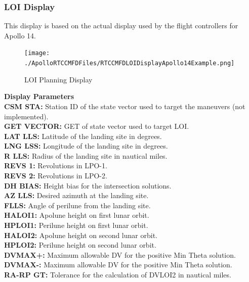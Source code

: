 \documentclass[11pt]{article} %
\begin{document}
\subsubsection{LOI Display}

This display is based on the actual display used by the flight controllers for Apollo 14.\\

\begin{figure}[hp]
	\centering
		\texttt{[image: ./ApolloRTCCMFDFiles/RTCCMFDLOIDisplayApollo14Example.png]}
	\caption{LOI Planning Display}
	\label{fig:RTCCMFDLOIDisplayApollo14Example}
\end{figure}

\textbf{Display Parameters}\\
\textbf{CSM STA:} Station ID of the state vector used to target the maneuvers (not implemented).\\
\textbf{GET VECTOR:} GET of state vector used to target LOI.\\
\textbf{LAT LLS:} Latitude of the landing site in degrees.\\
\textbf{LNG LSS:} Longitude of the landing site in degrees.\\
\textbf{R LLS:} Radius of the landing site in nautical miles.\\
\textbf{REVS 1:} Revolutions in LPO-1.\\
\textbf{REVS 2:} Revolutions in LPO-2.\\
\textbf{DH BIAS:} Height bias for the intersection solutions.\\
\textbf{AZ LLS:} Desired azimuth at the landing site.\\
\textbf{FLLS:} Angle of perilune from the landing site.\\
\textbf{HALOI1:} Apolune height on first lunar orbit.\\
\textbf{HPLOI1:} Perilune height on first lunar orbit.\\
\textbf{HALOI2:} Apolune height on second lunar orbit.\\
\textbf{HPLOI2:} Perilune height on second lunar orbit.\\
\textbf{DVMAX+:} Maximum allowable DV for the positive Min Theta solution.\\
\textbf{DVMAX-:} Maximum allowable DV for the positive Min Theta solution.\\
\textbf{RA-RP GT:} Tolerance for the calculation of DVLOI2 in nautical miles.\\
\end{document}
